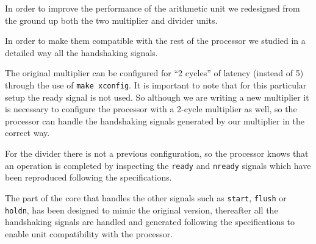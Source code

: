 In order to improve the performance of the arithmetic unit we redesigned from the ground up both the
two multiplier and divider units.

In order to make them compatible with the rest of the processor we studied in a detailed way all
the handshaking signals.

The original multiplier can be configured for ``2 cycles'' of latency (instead of 5) through the use of \texttt{make xconfig}.
It is important to note that for this particular setup the ready signal is not used.
So although we are writing a new multiplier it is necessary to configure the
processor with a 2-cycle multiplier as well, so the processor can handle the
handshaking signals generated by our multiplier in the correct way.

For the divider there is not a previous configuration, so the processor knows that an operation is
completed by inspecting the \texttt{ready} and \texttt{nready} signals which have been reproduced following the
specifications.

The part of the core that handles the other signals such as \texttt{start}, \texttt{flush} or \texttt{holdn}, has been designed
to mimic the original version, thereafter all the handshaking signals are handled and generated following the
specifications to enable unit compatibility with the processor.